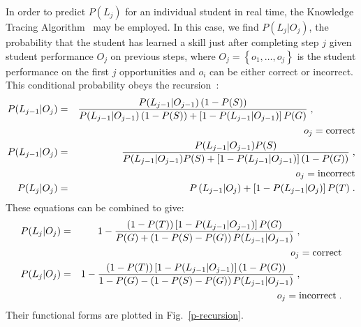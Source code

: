 \documentclass[jedm,acmnow]{acmtrans2m}
\begin{document}
In order to predict $P(L_j)$ for an individual student in real time,
the Knowledge Tracing Algorithm~\cite{corbett_knowledge_1995} may be employed.
In this case, we find $P(L_j|O_j)$,  the probability that the student has 
learned a skill just after completing step $j$ given student
performance $O_j$ on previous steps, where $O_j=\left\{o_1,\ldots,o_j\right\}$ is the student performance
on the first $j$ opportunities and $o_i$ can be either correct or
incorrect.  This conditional probability obeys the
recursion~\cite{baker_more_2008}: 
%
\begin{eqnarray}
       P(L_{j-1}|O_j) &=&
       \frac{P(L_{j-1}|O_{j-1})\left(1-P(S)\right)}{P(L_{j-1}|O_{j-1})\left(1-P(S)\right)+
                                       \left[1-P(L_{j-1}|O_{j-1})\right]P(G)} 
                                     \; ,  \hspace{10ex}\nonumber\\
            & &\hspace{45ex} o_j=\mbox{correct}\\
        P(L_{j-1}|O_j) &=& 
              \frac{P(L_{j-1}|O_{j-1}) P(S)}
              {P(L_{j-1}|O_{j-1}) P(S)+ \left[1-P(L_{j-1}|O_{j-1})\right]\left(1-P(G)\right)}
                        \; , \nonumber\\
           & &\hspace{45ex}o_j=\mbox{incorrect}\\
       P(L_j|O_j) &=& P\left(L_{j-1}|O_j\right)+
               \left[1-P(L_{j-1}|O_j)\right] P(T) \; .
\end{eqnarray}
%
These equations can be combined to give:
%
\begin{eqnarray}
       P(L_j|O_j) &=&
       1-\frac{\left(1-P(T)\right)\left[1-P(L_{j-1}|O_{j-1})\right]P(G)}{P(G)+\left(1-P(S)-P(G)\right)
        P(L_{j-1}|O_{j-1})}  \;, \hspace{10ex}\nonumber\\
                        & &\hspace{45ex}  o_j=\mbox{correct} \label{correct}\\
      P(L_j|O_j) &=& 1-\frac{\left(1-P(T)\right)\left[1-P(L_{j-1}|O_{j-1})\right]\left(1-P(G)\right)}
                                 {1-P(G)-\left(1-P(S)-P(G)\right) P(L_{j-1}|O_{j-1})}
                        \; , \hspace{10ex}\nonumber\\
                        & &\hspace{45ex} o_j=\mbox{incorrect} \; . \label{incorrect}
\end{eqnarray}
%
Their functional forms are plotted in Fig.~\ref{p-recursion}.  
\end{document}
